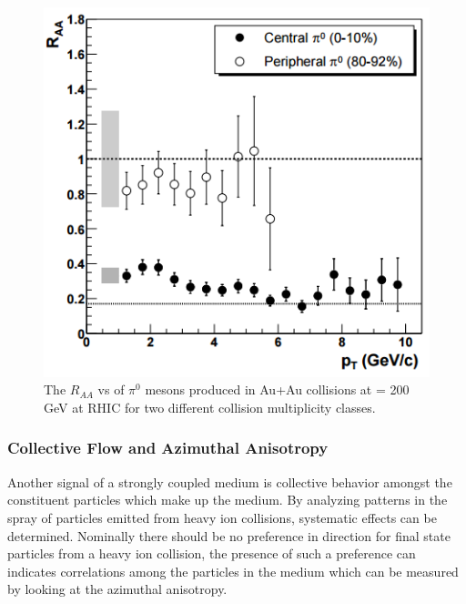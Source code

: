 \begin{figure}[!ht]
\begin{center}
\includegraphics[width=0.6\linewidth]{figs/raa_pi0_aa_cent_periph.png}
\caption{The $R_{AA}$  vs \pt of $\pi^0$ mesons produced in Au+Au collisions at \sqsn= 200 GeV at RHIC for two different collision multiplicity classes. ~\cite{PhysRevLett.91.072303}}
\end{center}
\label{fig:RAA_plot}
\end{figure}
\clearpage

\subsubsection{Collective Flow and Azimuthal Anisotropy}
Another signal of a strongly coupled medium is collective behavior amongst the constituent particles which make up the medium. By analyzing patterns in the spray of particles emitted from heavy ion collisions, systematic effects can be determined. Nominally there should be no preference in direction for final state particles from a heavy ion collision, the presence of such a preference can indicates correlations among the particles in the medium which can be measured by looking at the azimuthal anisotropy.

